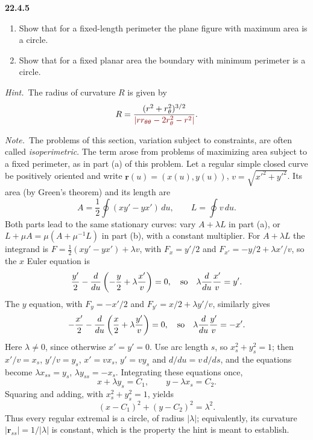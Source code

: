 \par\bigskip
\noindent\textbf{22.4.5}\quad
{}
\begin{enumerate}
\item[(a)] Show that for a fixed-length perimeter the plane
figure with maximum area is a circle.
\item[(b)] Show that for a fixed planar area the boundary with
minimum perimeter is a circle.
\end{enumerate}
\par\emph{Hint.}~The  radius of curvature $R$ is given by
\[
R=\frac{(r^{2}+r_{\theta}^{2})^{3/2}}
{\erratum{\left|rr_{\theta\theta}-2r_{\theta}^{2}-r^{2}\right|}}.
\]
\par\emph{Note.}~The problems of this section, variation subject
to constraints, are often called \emph{isoperimetric}. The term
arose from problems of maximizing area subject to a fixed
perimeter, as in part (a) of this problem.
\solution
Let a regular simple closed curve be positively oriented and write
$\mathbf r(u)=(x(u),y(u))$, $v=\sqrt{x'^2+y'^2}$.  Its area (by
Green's theorem) and its length are
\[
 A=\frac12\oint(xy'-yx')\,du,\qquad L=\oint v\,du.
\]
Both parts lead to the same stationary curves: vary $A+\lambda L$
in part (a), or $L+\mu A=\mu(A+\mu^{-1}L)$ in part (b), with a
constant multiplier. For $A+\lambda L$ the integrand is
$F=\frac12(xy'-yx')+\lambda v$, with $F_x=y'/2$ and
$F_{x'}=-y/2+\lambda x'/v$, so the $x$ Euler equation is
\[
 \frac{y'}2-\frac d{du}\left(-\frac y2+\lambda\frac{x'}v\right)=0,
 \quad\hbox{so}\quad
 \lambda\frac d{du}\frac{x'}v=y'.
\]
The $y$ equation, with $F_y=-x'/2$ and $F_{y'}=x/2+\lambda y'/v$,
similarly gives
\[
 -\frac{x'}2-\frac d{du}\left(\frac x2+\lambda\frac{y'}v\right)=0,
 \quad\hbox{so}\quad
 \lambda\frac d{du}\frac{y'}v=-x'.
\]
Here $\lambda\ne0$, since otherwise $x'=y'=0$. Use arc length $s$,
so $x_s^2+y_s^2=1$; then $x'/v=x_s$, $y'/v=y_s$, $x'=vx_s$,
$y'=vy_s$ and $d/du=v\,d/ds$, and the equations become
$\lambda x_{ss}=y_s$, $\lambda y_{ss}=-x_s$. Integrating these
equations once,
\[
 x+\lambda y_s=C_1,\qquad y-\lambda x_s=C_2.
\]
Squaring and adding, with $x_s^2+y_s^2=1$, yields
\[
 (x-C_1)^2+(y-C_2)^2=\lambda^2.
\]
Thus every regular extremal is a circle, of radius $|\lambda|$;
equivalently, its curvature $|\mathbf r_{ss}|=1/|\lambda|$ is constant,
which is the property the hint is meant to establish.

